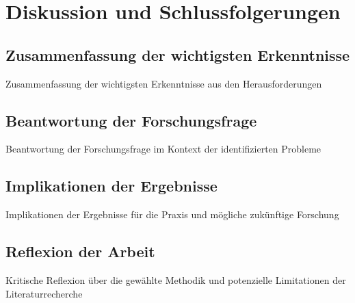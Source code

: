 \section{Diskussion und Schlussfolgerungen}
\subsection{Zusammenfassung der wichtigsten Erkenntnisse}
Zusammenfassung der wichtigsten Erkenntnisse aus den Herausforderungen
\subsection{Beantwortung der Forschungsfrage}
Beantwortung der Forschungsfrage im Kontext der identifizierten Probleme
\subsection{Implikationen der Ergebnisse}
Implikationen der Ergebnisse für die Praxis und mögliche zukünftige Forschung
\subsection{Reflexion der Arbeit}
Kritische Reflexion über die gewählte Methodik und potenzielle Limitationen der Literaturrecherche